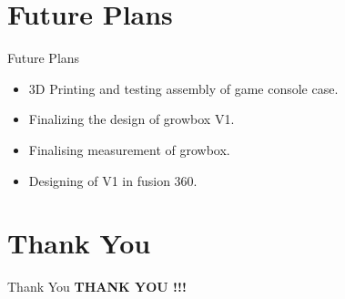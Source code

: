 \documentclass[10pt, a4paper]{beamer}
\begin{document}
\section{Future Plans}
\begin{frame}{Future Plans}
\transdissolve
	\begin{itemize}
		\item 3D Printing and testing assembly of game console case.
		\item Finalizing the design of growbox V1.
		\item Finalising measurement of growbox.
		\item Designing of V1 in fusion 360.
	\end{itemize}
\end{frame}
 
 
\section{Thank You}
\begin{frame}{Thank You}
	\centering \textbf{\large THANK YOU !!!}
	\end{frame}
\end{document}
